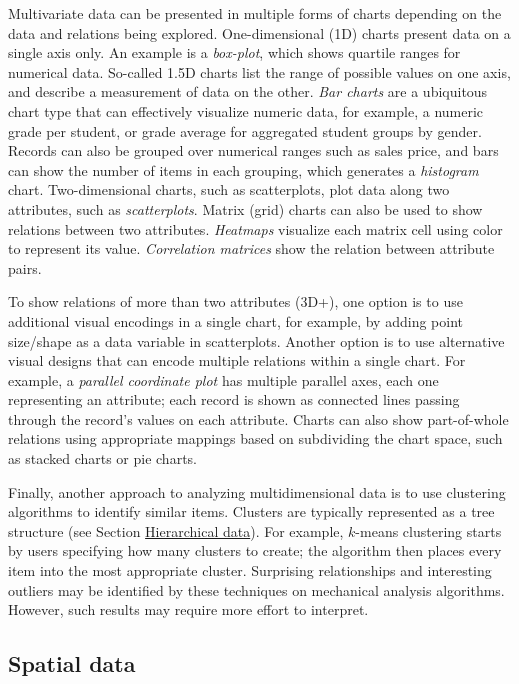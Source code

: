 \documentclass[]{krantz}
\begin{document}
Multivariate data can be presented in multiple forms of charts depending
on the data and relations being explored. One-dimensional (1D) charts
present data on a single axis only. An example is a \emph{box-plot},
which shows quartile ranges for numerical data. So-called 1.5D charts
list the range of possible values on one axis, and describe a
measurement of data on the other. \emph{Bar charts} are a ubiquitous
chart type that can effectively visualize numeric data, for example, a
numeric grade per student, or grade average for aggregated student
groups by gender. Records can also be grouped over numerical ranges such
as sales price, and bars can show the number of items in each grouping,
which generates a \emph{histogram} chart. Two-dimensional charts, such
as scatterplots, plot data along two attributes, such as
\emph{scatterplots}. Matrix (grid) charts can also be used to show
relations between two attributes. \emph{Heatmaps} visualize each matrix
cell using color to represent its value. \emph{Correlation matrices}
show the relation between attribute pairs.

To show relations of more than two attributes (3D+), one option is to
use additional visual encodings in a single chart, for example, by
adding point size/shape as a data variable in scatterplots. Another
option is to use alternative visual designs that can encode multiple
relations within a single chart. For example, a \emph{parallel
coordinate plot} \citep{inselberg2009} has multiple parallel axes, each
one representing an attribute; each record is shown as connected lines
passing through the record's values on each attribute. Charts can also
show part-of-whole relations using appropriate mappings based on
subdividing the chart space, such as stacked charts or pie charts.

Finally, another approach to analyzing multidimensional data is to use
clustering algorithms to identify similar items. Clusters are typically
represented as a tree structure (see Section
\protect\hyperlink{sec:viz-2.5}{Hierarchical data}). For example,
\(k\)-means clustering starts by users specifying how many clusters to
create; the algorithm then places every item into the most appropriate
cluster. Surprising relationships and interesting outliers may be
identified by these techniques on mechanical analysis algorithms.
However, such results may require more effort to interpret.

\subsection{Spatial data}\label{sec:viz-2.2}
\end{document}
